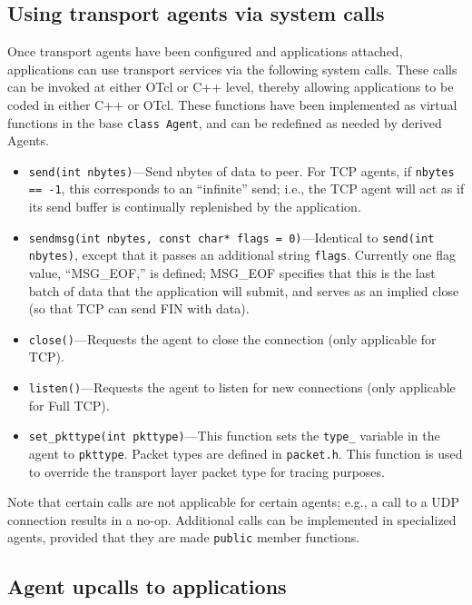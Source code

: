 \subsection{Using transport agents via system calls}
\label{sec:systemcalls}
Once transport agents have been configured and applications attached, 
applications can use transport 
services via the following system calls.  These calls can be invoked at either
OTcl or C++ level, thereby allowing applications to be coded in either C++ or
OTcl.  These functions have been implemented as virtual functions in the base
{\tt class Agent}, and can be redefined as needed by derived Agents. 
\begin{itemize}
\item {\tt send(int nbytes)}---Send nbytes of data to peer.  For TCP agents,
if {\tt nbytes == -1}, this corresponds to an ``infinite'' send; i.e., the
TCP agent will act as if its send buffer is continually replenished by the
application.
\item {\tt sendmsg(int nbytes, const char* flags = 0)}---Identical to 
{\tt send(int nbytes)}, except that it passes an additional string 
{\tt flags}.  Currently one flag value, ``MSG\_EOF,'' is defined; MSG\_EOF
specifies that this is the last batch of data that the application will 
submit, and serves as an implied close (so that TCP can send FIN with data).
\item {\tt close()}---Requests the agent to close the connection (only 
applicable for TCP).
\item {\tt listen()}---Requests the agent to listen for new connections
(only applicable for Full TCP).
\item {\tt set\_pkttype(int pkttype)}---This function sets the {\tt type\_} 
variable in the agent to {\tt pkttype}.  Packet types are defined in 
{\tt packet.h}.  This function is used to override the transport layer 
packet type for tracing purposes.  
\end{itemize}
Note that certain calls are not applicable for certain agents; e.g., a call
to  a UDP connection results in a no-op.  Additional calls
can be implemented in specialized agents, provided that they are made
{\tt public} member functions. 

\subsection{Agent upcalls to applications}
\label{sec:upcalls}

